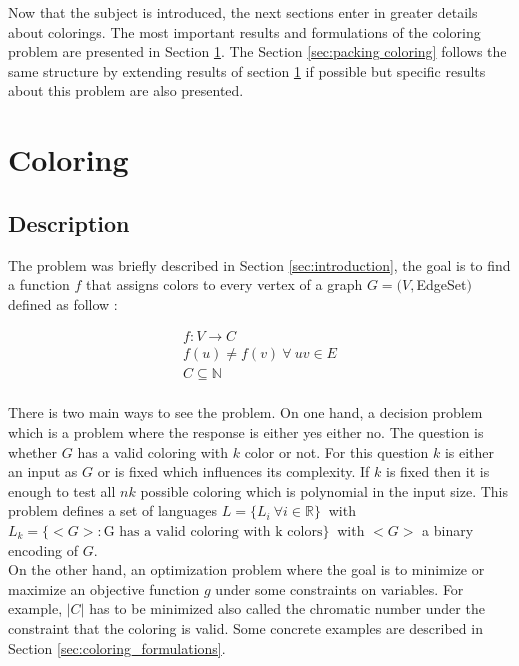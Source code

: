 Now that the subject is introduced, the next sections enter in greater details about colorings. The most important results and formulations of the coloring problem are presented in Section \ref{sec:coloring}. The Section \ref{sec:packing coloring} follows the same structure by extending results of section \ref{sec:coloring} if possible but specific results about this problem are also presented.


\chapter{Coloring}
\label{sec:coloring}

\section{Description}
\label{sec:coloring_description}

The problem was briefly described in Section \ref{sec:introduction}, the goal is to find a function $f$ that assigns colors to every vertex of a graph $G=(V,$\gls{EdgeSet}$)$ defined as follow :

\begin{equation}
\begin{aligned}
f : V \longrightarrow C \\
f(u) \neq f(v)\ \forall\ uv \in E \\
C \subseteq \mathbb{N} \\
\end{aligned}
\end{equation}

There is two main ways to see the problem. On one hand, a decision problem which is a problem where the response is either yes either no. The question is whether $G$ has a valid coloring with $k$ color or not. For this question $k$ is either an input as $G$ or is fixed which influences its complexity. If $k$ is fixed then it is enough to test all $nk$ possible coloring which is polynomial in the input size. This problem defines a set of languages $L = \{L_i\ \forall i \in \mathbb{R} \}\ $ with  $L_k = \{ <G> : \text{G has a valid coloring with k colors} \}\ $ with $<G>$ a binary encoding of $G$.\\
On the other hand, an optimization problem where the goal is to minimize or maximize an objective function $g$ under some constraints on variables. For example, $|C|$ has to be minimized also called the chromatic number under the constraint that the coloring is valid. Some concrete examples are described in Section \ref{sec:coloring_formulations}.\\

